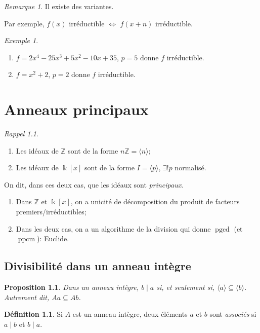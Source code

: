 \documentclass{report}
\newtheorem*{prop}{Proposition}
\theoremstyle{definition}
\newtheorem*{dfn}{D\'efinition}
\theoremstyle{remark}
\newtheorem*{exem}{Exemple}
\newtheorem*{rmq}{Remarque}
\newtheorem*{rapp}{Rappel}
\def\ZZ{\mathbb{Z}}
\def\pgcd{\operatorname{pgcd}}
\def\ppcm{\operatorname{ppcm}}
\begin{document}
	\begin{rmq}
		Il existe des variantes.

		Par exemple, $f(x)$ irr\'eductible $\Longleftrightarrow$ $f(x+n)$ irr\'eductible.
	\end{rmq}

	\begin{exem}
		\begin{enumerate}
			\item $f=2x^4-25x^3+5x^2-10x+35$, $p=5$ donne $f$ irr\'eductible.
			\item $f=x^2+2$, $p=2$ donne $f$ irr\'eductible.
		\end{enumerate}
	\end{exem}

	\chapter{Anneaux principaux}
	\begin{rapp}~

		\begin{enumerate}
			\item Les id\'eaux de $\ZZ$ sont de la forme $n\ZZ=\langle n \rangle$;
			\item Les id\'eaux de $\Bbbk[x]$ sont de la forme $I=\langle p \rangle$, $\exists!p$ normalis\'e.
		\end{enumerate}
		On dit, dans ces deux cas, que les id\'eaux sont \emph{principaux}.
		\begin{enumerate}[resume]
			\item Dans $\ZZ$ et $\Bbbk[x]$, on a unicit\'e de d\'ecomposition du produit de facteurs premiers/irr\'eductibles;
			\item Dans les deux cas, on a un algorithme de la division qui donne $\pgcd$ (et $\ppcm$): Euclide.
		\end{enumerate}
	\end{rapp}

	\section{Divisibilit\'e dans un anneau int\`egre}
	\begin{prop}
		Dans un anneau int\`egre, $b\mid a$ si, et seulement si, $\langle a \rangle \subseteq \langle b \rangle$. Autrement dit, $Aa \subseteq Ab$.
	\end{prop}

	\begin{dfn}
		Si $A$ est un anneau int\`egre, deux \'el\'ements $a$ et $b$ sont \emph{associ\'es} si $a\mid b$ et $b\mid a$.
	\end{dfn}
\end{document}
